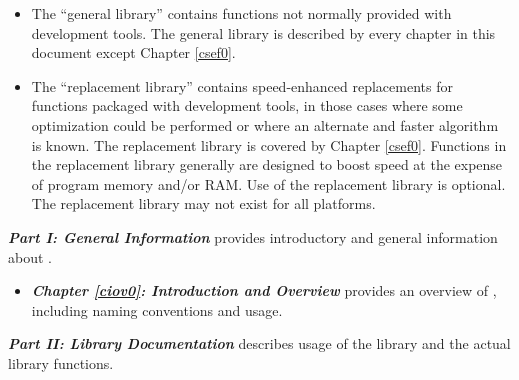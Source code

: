 \begin{itemize}
\item The ``general library'' contains functions not normally provided
      with development tools.  The general library is described by
      every chapter in this document except Chapter \ref{csef0}.
\item The ``replacement library'' contains
      speed-enhanced replacements
      for functions packaged with development tools, in those cases
      where some optimization could be performed or where an alternate
      and faster algorithm is known.  The replacement library is covered by 
      Chapter \ref{csef0}.  Functions in the replacement library
      generally are designed to boost speed at the expense of program
      memory and/or RAM\@.  Use of the replacement library is optional.
      The replacement library may not exist for all platforms.
\end{itemize}

\emph{\textbf{Part I: General Information}} provides introductory
and general information about \emph{\productbasenameshort{}}.

\begin{itemize}
\item \emph{\textbf{Chapter \ref{ciov0}: Introduction and Overview}}
      provides an overview of \emph{\productbasenameshort{}},
      including naming conventions and usage.
\end{itemize}

\emph{\textbf{Part II: Library Documentation}} describes
usage of the library and the actual library functions.

